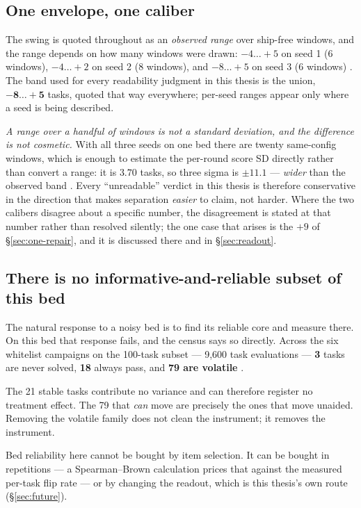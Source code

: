 \subsection*{One envelope, one caliber}

The swing is quoted throughout as an \emph{observed range} over ship-free
windows, and the range depends on how many windows were drawn:
$-4\ldots{+}5$ on seed 1 (6 windows), $-4\ldots{+}2$ on seed 2 (8
windows), and $-8\ldots{+}5$ on seed 3 (6 windows) .
The band used for every readability judgment in this thesis is the union,
$\mathbf{-8\ldots{+}5}$ tasks, quoted that way everywhere; per-seed
ranges appear only where a seed is being described.

\emph{A range over a handful of windows is not a standard deviation, and
the difference is not cosmetic.} With all three seeds on one bed there are
twenty same-config windows, which is enough to estimate the per-round score
SD directly rather than convert a range: it is $\mathbf{3.70}$ tasks, so
three sigma is $\pm 11.1$ --- \emph{wider} than the observed band
. Every ``unreadable'' verdict in this thesis is therefore
conservative in the direction that makes separation \emph{easier} to
claim, not harder.
Where the two calibers disagree about a specific number, the disagreement
is stated at that number rather than resolved silently; the one case that
arises is the $+9$ of \S\ref{sec:one-repair}, and it is discussed there and
in \S\ref{sec:readout}.

\subsection*{There is no informative-and-reliable subset of this bed}

The natural response to a noisy bed is to find its reliable core and
measure there. On this bed that response fails, and the census says so
directly. Across the six whitelist campaigns on the 100-task subset ---
9{,}600 task evaluations --- \textbf{3} tasks are never solved,
\textbf{18} always pass, and \textbf{79 are volatile} .

The 21 stable tasks contribute no variance and can therefore register no
treatment effect. The 79 that \emph{can} move are precisely the ones that
move unaided. Removing the volatile family does not clean the instrument;
it removes the instrument.

Bed reliability here cannot be bought by item selection. It can be bought
in repetitions --- a Spearman--Brown calculation prices that against the
measured per-task flip rate --- or by changing the readout, which is this
thesis's own route (\S\ref{sec:future}).

